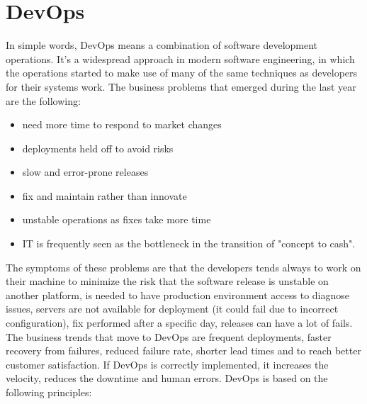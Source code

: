 \section{DevOps}
In simple words, DevOps means a combination of software development operations.
It's a widespread approach in modern software engineering, in which the operations started to make use of many of the same techniques as developers for their systems work.
The business problems that emerged during the last year are the following:
\begin{itemize}
    \item need more time to respond to market changes
    \item deployments held off to avoid risks
    \item slow and error-prone releases
    \item fix and maintain rather than innovate
    \item unstable operations as fixes take more time
    \item IT is frequently seen as the bottleneck in the transition of "concept to cash".
\end{itemize}
The symptoms of these problems are that the developers tends always to work on their machine to minimize the risk that the software release is unstable on another platform, is needed to have production environment access to diagnose issues, servers are not available for deployment (it could fail due to incorrect configuration), fix performed after a specific day, releases can have a lot of fails.
The business trends that move to DevOps are frequent deployments, faster recovery from failures, reduced failure rate, shorter lead times and to reach better customer satisfaction.
If DevOps is correctly implemented, it increases the velocity, reduces the downtime and human errors.
DevOps is based on the following principles:
